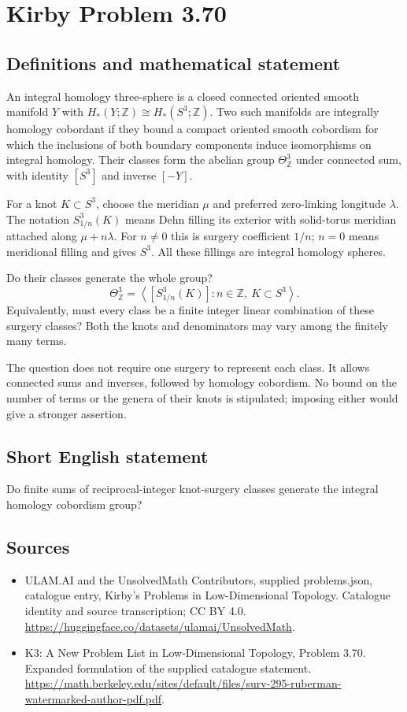 \documentclass[11pt,a4paper]{article}
\begin{document}
\section*{Kirby Problem 3.70}\label{statement}

\subsection{Definitions and mathematical statement}
An integral homology three-sphere is a closed connected oriented smooth manifold $Y$ with $H_*(Y;\mathbb Z)\cong H_*(S^3;\mathbb Z)$. Two such manifolds are integrally homology cobordant if they bound a compact oriented smooth cobordism for which the inclusions of both boundary components induce isomorphisms on integral homology. Their classes form the abelian group $\Theta^3_{\mathbb Z}$ under connected sum, with identity $[S^3]$ and inverse $[-Y]$.

For a knot $K\subset S^3$, choose the meridian $\mu$ and preferred zero-linking longitude $\lambda$. The notation $S^3_{1/n}(K)$ means Dehn filling its exterior with solid-torus meridian attached along $\mu+n\lambda$. For $n\ne0$ this is surgery coefficient $1/n$; $n=0$ means meridional filling and gives $S^3$. All these fillings are integral homology spheres.

Do their classes generate the whole group?
\[
\Theta^3_{\mathbb Z}
=\left\langle [S^3_{1/n}(K)]:n\in\mathbb Z,\ K\subset S^3\right\rangle.
\]
Equivalently, must every class be a finite integer linear combination of these surgery classes? Both the knots and denominators may vary among the finitely many terms.

The question does not require one surgery to represent each class. It allows connected sums and inverses, followed by homology cobordism. No bound on the number of terms or the genera of their knots is stipulated; imposing either would give a stronger assertion.
\subsection{Short English statement}
Do finite sums of reciprocal-integer knot-surgery classes generate the integral homology cobordism group?
\subsection{Sources}
\begin{itemize}
\item[S1] ULAM.AI and the UnsolvedMath Contributors, supplied problems.json, catalogue entry, Kirby's Problems in Low-Dimensional Topology. Catalogue identity and source transcription; CC BY 4.0.
\url{https://huggingface.co/datasets/ulamai/UnsolvedMath}.
\item[S2] K3: A New Problem List in Low-Dimensional Topology, Problem 3.70. Expanded formulation of the supplied catalogue statement.
\url{https://math.berkeley.edu/sites/default/files/surv-295-ruberman-watermarked-author-pdf.pdf}.
\end{itemize}
\end{document}
